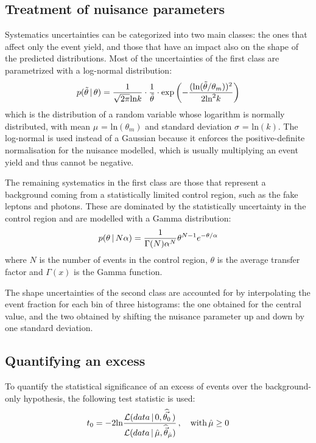 \subsection{Treatment of nuisance parameters}
Systematics uncertainties can be categorized into two main classes: the ones that affect only the event yield, and those that have an impact also on the shape of the predicted distributions.
Most of the uncertainties of the first class are parametrized with a log-normal distribution:
\begin{equation}
  \label{eq:lnNdef}
  p(\tilde{\theta}\,|\,\theta) = \frac{1}{\sqrt{2 \pi} \text{ln} k} \cdot \frac{1}{\tilde{\theta}} \cdot \text{exp} \left( -\frac{(\text{ln}(\tilde{\theta}/\theta_m))^2}{2 \text{ln}^2 k} \right)
\end{equation}
which is the distribution of a random variable whose logarithm is normally distributed, with mean $\mu$ = $\text{ln}(\theta_m)$ and standard deviation $\sigma$ = $\text{ln}(k)$.
The log-normal is used instead of a Gaussian because it enforces the positive-definite normalisation for the nuisance modelled, which is usually multiplying an event yield and thus cannot be negative.

The remaining systematics in the first class are those that represent a background coming from a statistically limited control region, such as the fake leptons and photons.
These are dominated by the statistically uncertainty in the control region and are modelled with a Gamma distribution:
\begin{equation}
  \label{eq:gammadef}
  p(\theta\,|\,N\alpha) = \frac{1}{\Gamma(N) \alpha^N} \theta^{N-1} e^{-\theta/\alpha}
\end{equation}
where $N$ is the number of events in the control region, $\theta$ is the average transfer factor and $\Gamma(x)$ is the Gamma function.

The shape uncertainties of the second class are accounted for by interpolating the event fraction for each bin of three histograms: the one obtained for the central value, and the two obtained by shifting the nuisance parameter up and down by one standard deviation.

\subsection{Quantifying an excess}
To quantify the statistical significance of an excess of events over the background-only hypothesis, the following test statistic is used:
\begin{equation}
  \label{eq:test_statistic}
  t_0 = -2\text{ln} \frac {\mathcal{L}(data\,|\,0,\widehat{\vec{\theta_0}}\,)} {\mathcal{L}(data\,|\,\hat\mu,\widehat{\vec\theta}_{\hat\mu})}\,,\quad \text{with}\, \hat\mu \ge 0
\end{equation}

